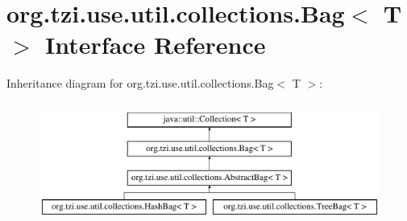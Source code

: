 \hypertarget{interfaceorg_1_1tzi_1_1use_1_1util_1_1collections_1_1_bag_3_01_t_01_4}{\section{org.\-tzi.\-use.\-util.\-collections.\-Bag$<$ T $>$ Interface Reference}
\label{interfaceorg_1_1tzi_1_1use_1_1util_1_1collections_1_1_bag_3_01_t_01_4}
}
Inheritance diagram for org.\-tzi.\-use.\-util.\-collections.\-Bag$<$ T $>$\-:\begin{figure}[H]
\begin{center}
\leavevmode
\includegraphics[height=4.000000cm]{interfaceorg_1_1tzi_1_1use_1_1util_1_1collections_1_1_bag_3_01_t_01_4}
\end{center}
\end{figure}
